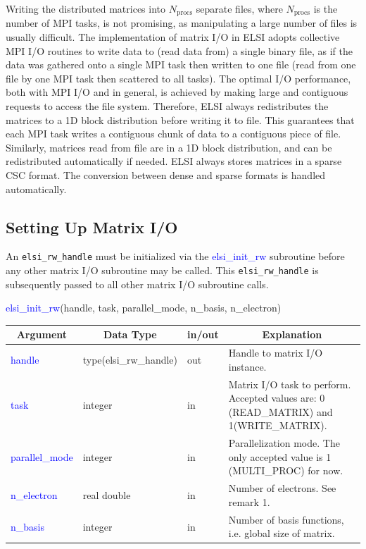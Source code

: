 \documentclass{report}
\newcommand{\tcb}[1]{\textcolor{blue}{#1}}
\begin{document}
Writing the distributed matrices into $N_\text{procs}$ separate files, where $N_\text{procs}$ is the number of MPI tasks, is not promising, as manipulating a large number of files is usually difficult. The implementation of matrix I/O in ELSI adopts collective MPI I/O routines to write data to (read data from) a single binary file, as if the data was gathered onto a single MPI task then written to one file (read from one file by one MPI task then scattered to all tasks). The optimal I/O performance, both with MPI I/O and in general, is achieved by making large and contiguous requests to access the file system. Therefore, ELSI always redistributes the matrices to a 1D block distribution before writing it to file. This guarantees that each MPI task writes a contiguous chunk of data to a contiguous piece of file. Similarly, matrices read from file are in a 1D block distribution, and can be redistributed automatically if needed. ELSI always stores matrices in a sparse CSC format. The conversion between dense and sparse formats is handled automatically.

\subsection{Setting Up Matrix I/O}
\label{subsec:rw_init}
An \texttt{elsi\_rw\_handle} must be initialized via the \tcb{elsi\_init\_rw} subroutine before any other matrix I/O subroutine may be called. This \texttt{elsi\_rw\_handle} is subsequently passed to all other matrix I/O subroutine calls.

\newpage
\begin{labeling}{\hspace{6cm}}
\item [\hspace{0.3cm} \tcb{elsi\_init\_rw}(handle, task, parallel\_mode, n\_basis, n\_electron)]
\end{labeling}

\begin{tabular}[]{|p{20mm}|p{45mm}|p{15mm}|p{85mm}|}
\hline
\multicolumn{1}{|c|}{\textbf{Argument}} & \multicolumn{1}{c|}{\textbf{Data Type}} & \multicolumn{1}{c|}{\textbf{in/out}} & \multicolumn{1}{c|}{\textbf{Explanation}}\\
\hline
\tcb{handle}         & type(elsi\_rw\_handle) & out & Handle to matrix I/O instance.\\
\hline
\tcb{task}           & integer                & in  & Matrix I/O task to perform. Accepted values are: 0 (READ\_MATRIX) and 1(WRITE\_MATRIX).\\
\hline
\tcb{parallel\_mode} & integer                & in  & Parallelization mode. The only accepted value is 1 (MULTI\_PROC) for now.\\
\hline
\tcb{n\_electron}    & real double            & in  & Number of electrons. See remark 1.\\
\hline
\tcb{n\_basis}       & integer                & in  & Number of basis functions, i.e. global size of matrix.\\
\hline
\end{tabular}
\end{document}
